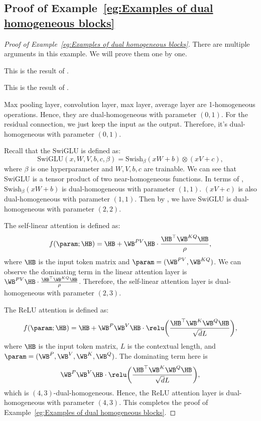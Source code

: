 \subsection{Proof of Example~\ref{eg:Examples of dual homogeneous blocks}}
\begin{proof}[Proof of Example~\ref{eg:Examples of dual homogeneous blocks}]
There are multiple arguments in this example. We will prove them one by one.

 This is the result of . 

 This is the result of . 

 Max pooling layer, convolution layer, max layer, average layer are 1-homogeneous operations. Hence, they are dual-homogeneous with parameter $(0,1)$. For the residual connection, we just keep the input as the output. Therefore, it's dual-homogeneous with parameter $(0,1)$.

 Recall that the SwiGLU is defined as: 
\[
\text{SwiGLU}(x, W, V, b,c,\beta) = \text{Swish}_{\beta} (xW+ b) \otimes (xV+c), 
\]
where $\beta$ is one hyperparameter and $W,V,b,c$ are trainable. We can see that SwiGLU is a tensor product of two near-homogeneous functions. In terms of , $\text{Swish}_{\beta} (xW+ b)$ is dual-homogeneous with parameter $(1,1)$. $(xV+c)$ is also dual-homogeneous with parameter $(1,1)$. Then by , we have $\text{SwiGLU}$ is dual-homogeneous with parameter $(2,2)$.  

 The self-linear attention \citep{zhang2024trained} is defined as: 
\[
 f(\param;\HB)  =  \HB + \WB^{PV} \HB \cdot \frac{\HB^\top \WB^{KQ} \HB}{\rho}, 
\]
where $\HB$ is the input token matrix and $\param = (\WB^{PV}, \WB^{KQ})$.  We can observe the dominating term in the linear attention layer is $\WB^{PV} \HB \cdot \frac{\HB^\top \WB^{KQ} \HB}{\rho}$. Therefore, the self-linear attention layer is dual-homogeneous with parameter $(2,3)$.

The ReLU attention \citep{wortsman2023replacing} is defined as: 
\[
f(\param;\HB)  =  \HB + \WB^{P} \WB^{V} \HB \cdot \relu  \bigg(\frac{\HB^\top \WB^{K} \WB^{Q} \HB}{\sqrt{d}L} \bigg), 
\]
where $\HB$ is the input token matrix, $L$ is the contextual length,  and $\param = (\WB^{P}, \WB^{V}, \WB^{K}, \WB^{Q})$. The dominating term here is 
\[
\WB^{P} \WB^{V} \HB \cdot \relu  \bigg(\frac{\HB^\top \WB^{K} \WB^{Q} \HB}{\sqrt{d}L} \bigg),
\]
which is $(4,3)$-dual-homogeneous. Hence, the ReLU attention layer is dual-homogeneous with parameter $(4,3)$.
This completes the proof of Example~\ref{eg:Examples of dual homogeneous blocks}.
\end{proof}


